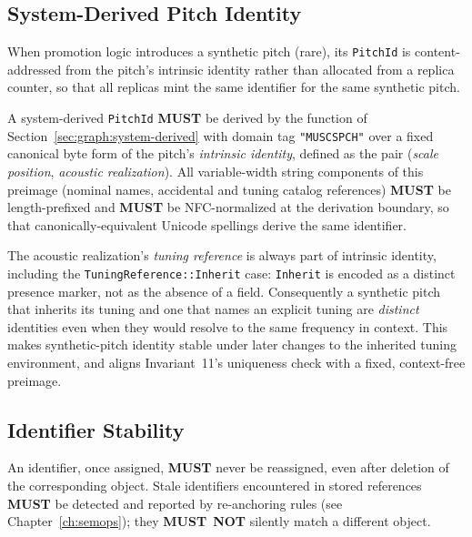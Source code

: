 \documentclass[11pt,letterpaper]{report}
\newcounter{requirement}[chapter]
\newcommand{\MUST}{\textbf{MUST}}
\newcommand{\MUSTNOT}{\textbf{MUST}\nobreak\ \textbf{NOT}}
\begin{document}
\subsection{System-Derived Pitch Identity}
\label{sec:graph:system-derived-pitch}

When promotion logic introduces a synthetic pitch (rare), its
\texttt{PitchId} is content-addressed from the pitch's intrinsic
identity rather than allocated from a replica counter, so that all
replicas mint the same identifier for the same synthetic pitch.

\begin{requirement}
  \label{req:graph:system-derived-pitch-id}
  A system-derived \texttt{PitchId} \MUST{} be derived by the
  function of Section~\ref{sec:graph:system-derived} with domain tag
  \texttt{"MUSCSPCH"} over a fixed canonical byte form of the pitch's
  \emph{intrinsic identity}, defined as the pair (\emph{scale
  position}, \emph{acoustic realization}). All variable-width string
  components of this preimage (nominal names, accidental and tuning
  catalog references) \MUST{} be length-prefixed and \MUST{} be
  NFC-normalized at the derivation boundary, so that
  canonically-equivalent Unicode spellings derive the same identifier.

  The acoustic realization's \emph{tuning reference} is always part of
  intrinsic identity, including the \texttt{TuningReference::Inherit}
  case: \texttt{Inherit} is encoded as a distinct presence marker, not
  as the absence of a field. Consequently a synthetic pitch that
  inherits its tuning and one that names an explicit tuning are
  \emph{distinct} identities even when they would resolve to the same
  frequency in context. This makes synthetic-pitch identity stable
  under later changes to the inherited tuning environment, and aligns
  Invariant~11's uniqueness check with a fixed, context-free preimage.
\end{requirement}

\subsection{Identifier Stability}

\begin{requirement}
  \label{req:graph:identifier-non-reuse}
  An identifier, once assigned, \MUST{} never be reassigned, even
  after deletion of the corresponding object. Stale identifiers
  encountered in stored references \MUST{} be detected and reported
  by re-anchoring rules (see Chapter~\ref{ch:semops}); they
  \MUSTNOT{} silently match a different object.
\end{requirement}
\end{document}
